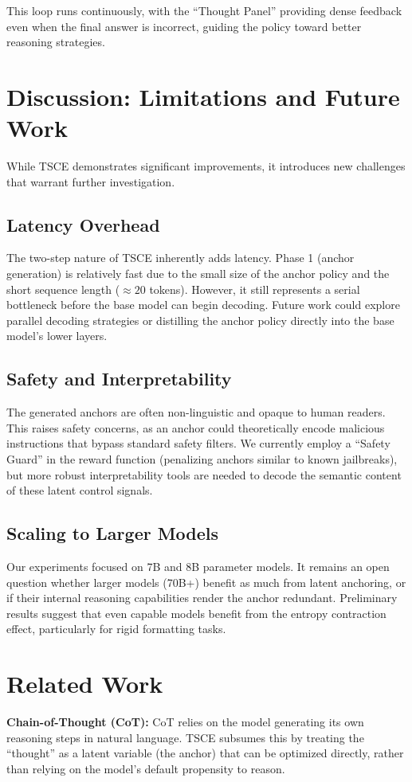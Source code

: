 \documentclass[11pt]{article}
\begin{document}
This loop runs continuously, with the ``Thought Panel'' providing dense feedback even when the final answer is incorrect, guiding the policy toward better reasoning strategies.

\section{Discussion: Limitations and Future Work}
While TSCE demonstrates significant improvements, it introduces new challenges that warrant further investigation.

\subsection{Latency Overhead}
The two-step nature of TSCE inherently adds latency. Phase 1 (anchor generation) is relatively fast due to the small size of the anchor policy and the short sequence length ($\approx 20$ tokens). However, it still represents a serial bottleneck before the base model can begin decoding. Future work could explore parallel decoding strategies or distilling the anchor policy directly into the base model's lower layers.

\subsection{Safety and Interpretability}
The generated anchors are often non-linguistic and opaque to human readers. This raises safety concerns, as an anchor could theoretically encode malicious instructions that bypass standard safety filters. We currently employ a ``Safety Guard'' in the reward function (penalizing anchors similar to known jailbreaks), but more robust interpretability tools are needed to decode the semantic content of these latent control signals.

\subsection{Scaling to Larger Models}
Our experiments focused on 7B and 8B parameter models. It remains an open question whether larger models (70B+) benefit as much from latent anchoring, or if their internal reasoning capabilities render the anchor redundant. Preliminary results suggest that even capable models benefit from the entropy contraction effect, particularly for rigid formatting tasks.

\section{Related Work}
\textbf{Chain-of-Thought (CoT):} CoT relies on the model generating its own reasoning steps in natural language. TSCE subsumes this by treating the ``thought'' as a latent variable (the anchor) that can be optimized directly, rather than relying on the model's default propensity to reason.
\end{document}
